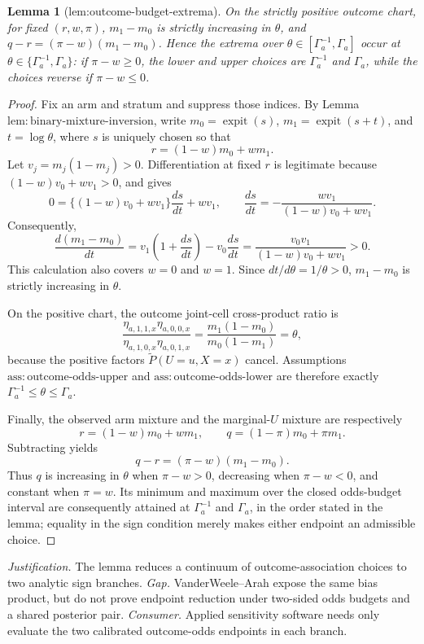 \documentclass{article}
\newtheorem{lemma}{Lemma}
\begin{document}
\begin{lemma}[lem:outcome-budget-extrema]\label{lem:outcome-budget-extrema}
On the strictly positive outcome chart, for fixed \((r,w,\pi)\), \(m_1-m_0\) is strictly increasing in \(\theta\), and \(q-r=(\pi-w)(m_1-m_0)\).  Hence the extrema over \(\theta\in[\Gamma_a^{-1},\Gamma_a]\) occur at \(\theta\in\{\Gamma_a^{-1},\Gamma_a\}\): if \(\pi-w\geq0\), the lower and upper choices are \(\Gamma_a^{-1}\) and \(\Gamma_a\), while the choices reverse if \(\pi-w\leq0\).
\end{lemma}
\begin{proof}
Fix an arm and stratum and suppress those indices.  By Lemma \(\mathrm{lem{:}binary\text{-}mixture\text{-}inversion}\), write \(m_0=\operatorname{expit}(s)\), \(m_1=\operatorname{expit}(s+t)\), and \(t=\log\theta\), where \(s\) is uniquely chosen so that
\[
r=(1-w)m_0+wm_1.
\]
Let \(v_j=m_j(1-m_j)>0\).  Differentiation at fixed \(r\) is legitimate because \((1-w)v_0+wv_1>0\), and gives
\[
0=\{(1-w)v_0+wv_1\}\frac{ds}{dt}+wv_1,
\qquad
\frac{ds}{dt}=-\frac{wv_1}{(1-w)v_0+wv_1}.
\]
Consequently,
\[
\frac{d(m_1-m_0)}{dt}
=v_1\left(1+\frac{ds}{dt}\right)-v_0\frac{ds}{dt}
=\frac{v_0v_1}{(1-w)v_0+wv_1}>0.
\]
This calculation also covers \(w=0\) and \(w=1\).  Since \(dt/d\theta=1/\theta>0\), \(m_1-m_0\) is strictly increasing in \(\theta\).

On the positive chart, the outcome joint-cell cross-product ratio is
\[
\frac{\eta_{a,1,1,x}\eta_{a,0,0,x}}
     {\eta_{a,1,0,x}\eta_{a,0,1,x}}
=\frac{m_1(1-m_0)}{m_0(1-m_1)}=\theta,
\]
because the positive factors \(\widetilde P(U=u,X=x)\) cancel.  Assumptions \(\mathrm{ass{:}outcome\text{-}odds\text{-}upper}\) and \(\mathrm{ass{:}outcome\text{-}odds\text{-}lower}\) are therefore exactly \(\Gamma_a^{-1}\leq\theta\leq\Gamma_a\).

Finally, the observed arm mixture and the marginal-\(U\) mixture are respectively
\[
r=(1-w)m_0+wm_1,
\qquad
q=(1-\pi)m_0+\pi m_1.
\]
Subtracting yields
\[
q-r=(\pi-w)(m_1-m_0).
\]
Thus \(q\) is increasing in \(\theta\) when \(\pi-w>0\), decreasing when \(\pi-w<0\), and constant when \(\pi=w\).  Its minimum and maximum over the closed odds-budget interval are consequently attained at \(\Gamma_a^{-1}\) and \(\Gamma_a\), in the order stated in the lemma; equality in the sign condition merely makes either endpoint an admissible choice.
\end{proof}
\par\smallskip\noindent \textit{Justification.} The lemma reduces a continuum of outcome-association choices to two analytic sign branches. \textit{Gap.} VanderWeele--Arah expose the same bias product, but do not prove endpoint reduction under two-sided odds budgets and a shared posterior pair. \textit{Consumer.} Applied sensitivity software needs only evaluate the two calibrated outcome-odds endpoints in each branch.
\end{document}
